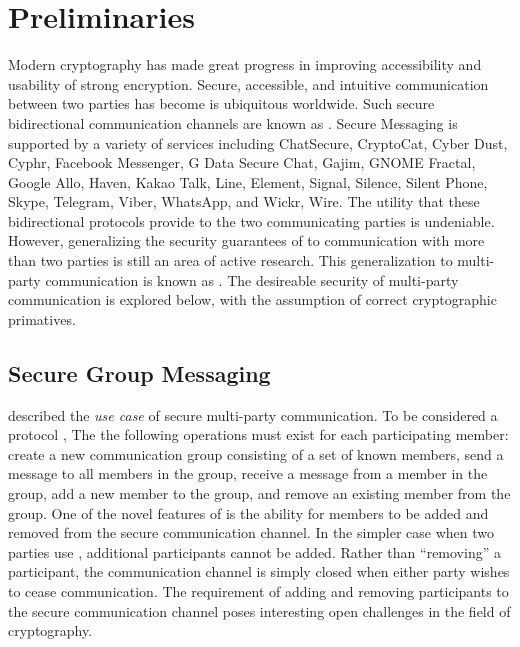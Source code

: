 \hypertarget{preliminaries}{%
\chapter{Preliminaries}\label{preliminaries}}

Modern cryptography has made great progress in improving accessibility and usability of strong encryption.
Secure, accessible, and intuitive communication between two parties has become is ubiquitous worldwide.
Such secure bidirectional communication channels are known as .
Secure Messaging is supported by a variety of services including ChatSecure, CryptoCat, Cyber Dust, Cyphr, Facebook Messenger, G Data Secure Chat, Gajim, GNOME Fractal, Google Allo, Haven, Kakao Talk, Line, Element, Signal, Silence, Silent Phone, Skype, Telegram, Viber, WhatsApp, and Wickr, Wire.
The utility that these bidirectional protocols provide to the two communicating parties is undeniable.
However, generalizing the security guarantees of  to communication with more than two parties is still an area of active research.
This generalization to multi-party communication is known as .
The desireable security of multi-party communication is explored below, with the assumption of correct cryptographic primatives.


\hypertarget{secure-group-messaging}{%
\section{Secure Group Messaging}\label{secure-group-messaging}}

 described the \emph{use case} of secure multi-party communication.
To be considered a  protocol \autocite{ietf-mls-protocol-14}, The  the following operations must exist for each participating member: create a new communication group consisting of a set of known members, send a message to all members in the group, receive a message from a member in the group, add a new member to the group, and remove an existing member from the group.
One of the novel features of  is the ability for members to be added and removed from the secure communication channel.
In the simpler case when two parties use , additional participants cannot be added.
Rather than ``removing'' a participant, the communication channel is simply closed when either party wishes to cease communication.
The  requirement of adding and removing participants to the secure communication channel poses interesting open challenges in the field of cryptography.


